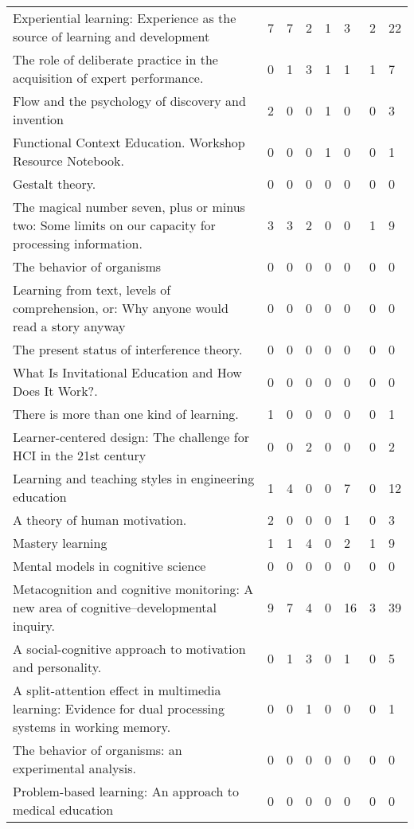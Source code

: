 \begin{table*}[t]
\begin{tabular}{p{10cm}lllllll}
Experiential learning: Experience as the source of learning and development & 7 & 7 & 2 & 1 & 3 & 2 & 22\\
The role of deliberate practice in the acquisition of expert performance. & 0 & 1 & 3 & 1 & 1 & 1 & 7\\
Flow and the psychology of discovery and invention & 2 & 0 & 0 & 1 & 0 & 0 & 3\\
Functional Context Education. Workshop Resource Notebook. & 0 & 0 & 0 & 1 & 0 & 0 & 1\\
Gestalt theory. & 0 & 0 & 0 & 0 & 0 & 0 & 0\\
The magical number seven, plus or minus two: Some limits on our capacity for processing information. & 3 & 3 & 2 & 0 & 0 & 1 & 9\\
The behavior of organisms & 0 & 0 & 0 & 0 & 0 & 0 & 0\\
Learning from text, levels of comprehension, or: Why anyone would read a story anyway & 0 & 0 & 0 & 0 & 0 & 0 & 0\\
The present status of interference theory. & 0 & 0 & 0 & 0 & 0 & 0 & 0\\
What Is Invitational Education and How Does It Work?. & 0 & 0 & 0 & 0 & 0 & 0 & 0\\
There is more than one kind of learning. & 1 & 0 & 0 & 0 & 0 & 0 & 1\\
Learner-centered design: The challenge for HCI in the 21st century & 0 & 0 & 2 & 0 & 0 & 0 & 2\\
Learning and teaching styles in engineering education & 1 & 4 & 0 & 0 & 7 & 0 & 12\\
A theory of human motivation. & 2 & 0 & 0 & 0 & 1 & 0 & 3\\
Mastery learning & 1 & 1 & 4 & 0 & 2 & 1 & 9\\
Mental models in cognitive science & 0 & 0 & 0 & 0 & 0 & 0 & 0\\
Metacognition and cognitive monitoring: A new area of cognitive--developmental inquiry. & 9 & 7 & 4 & 0 & 16 & 3 & 39\\
A social-cognitive approach to motivation and personality. & 0 & 1 & 3 & 0 & 1 & 0 & 5\\
A split-attention effect in multimedia learning: Evidence for dual processing systems in working memory. & 0 & 0 & 1 & 0 & 0 & 0 & 1\\
The behavior of organisms: an experimental analysis. & 0 & 0 & 0 & 0 & 0 & 0 & 0\\
Problem-based learning: An approach to medical education & 0 & 0 & 0 & 0 & 0 & 0 & 0\\

\end{tabular}
\end{table*}
